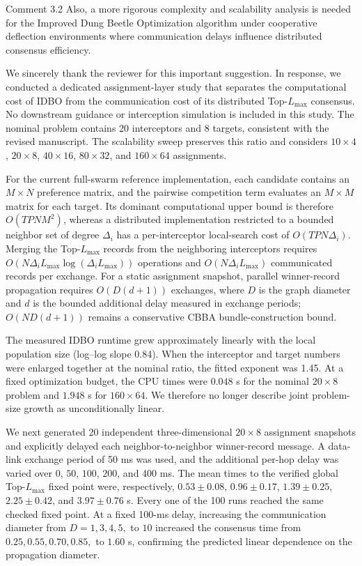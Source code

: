 \begin{reviewercomment}{Comment 3.2}
Also, a more rigorous complexity and scalability analysis is needed for the
Improved Dung Beetle Optimization algorithm under cooperative deflection
environments where communication delays influence distributed consensus
efficiency.
\end{reviewercomment}

\rsp We sincerely thank the reviewer for this important suggestion. In
response, we conducted a dedicated assignment-layer study that separates the
computational cost of IDBO from the communication cost of its distributed
Top-$L_{\max}$ consensus. No downstream guidance or interception simulation is
included in this study. The nominal problem contains 20 interceptors and 8
targets, consistent with the revised manuscript. The scalability sweep preserves
this ratio and considers $10\!\times\!4$, $20\!\times\!8$,
$40\!\times\!16$, $80\!\times\!32$, and $160\!\times\!64$ assignments.

For the current full-swarm reference implementation, each candidate contains an
$M\times N$ preference matrix, and the pairwise competition term evaluates an
$M\times M$ matrix for each target. Its dominant computational upper bound is
therefore $O(TPNM^2)$, whereas a distributed implementation restricted to a
bounded neighbor set of degree $\Delta_i$ has a per-interceptor local-search
cost of $O(TPN\Delta_i)$. Merging the Top-$L_{\max}$ records from the
neighboring interceptors requires
$O\!\left(N\Delta_iL_{\max}\log(\Delta_iL_{\max})\right)$ operations and
$O(N\Delta_iL_{\max})$ communicated records per exchange. For a static
assignment snapshot, parallel winner-record propagation requires
$O(D(d+1))$ exchanges, where $D$ is the graph diameter and $d$ is the bounded
additional delay measured in exchange periods; $O(ND(d+1))$ remains a
conservative CBBA bundle-construction bound.

The measured IDBO runtime grew approximately linearly with the local population
size (log--log slope 0.84). When the interceptor and target numbers were enlarged
together at the nominal ratio, the fitted exponent was 1.45. At a fixed
optimization budget, the CPU times were $0.048$ s for the nominal
$20\!\times\!8$ problem and $1.948$ s for $160\!\times\!64$. We therefore no
longer describe joint problem-size growth as unconditionally linear.

We next generated 20 independent three-dimensional $20\!\times\!8$ assignment
snapshots and explicitly delayed each neighbor-to-neighbor winner-record
message. A data-link exchange period of 50 ms was used, and the additional
per-hop delay was varied over $0$, $50$, $100$, $200$, and $400$ ms. The mean
times to the verified global Top-$L_{\max}$ fixed point were, respectively,
$0.53\pm0.08$, $0.96\pm0.17$, $1.39\pm0.25$,
$2.25\pm0.42$, and $3.97\pm0.76$ s. Every one of the 100 runs reached the
same checked fixed point. At a fixed 100-ms delay, increasing the communication
diameter from $D=1,3,4,5,$ to $10$ increased the consensus time from
$0.25,0.55,0.70,0.85,$ to $1.60$ s, confirming the predicted linear dependence
on the propagation diameter.

